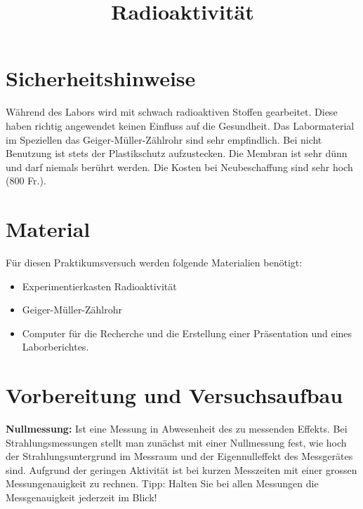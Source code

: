 \documentclass[12pt,a4paper, twosite]{article}
\author{}
\date{}
\title{Radioaktivität}
\begin{document}
\maketitle

\section*{Sicherheitshinweise}
Während des Labors wird mit schwach radioaktiven Stoffen gearbeitet. Diese haben richtig angewendet keinen Einfluss auf
die Gesundheit. Das Labormaterial im Speziellen das Geiger-Müller-Zählrohr sind sehr empfindlich.
Bei nicht Benutzung ist stets der Plastikschutz aufzustecken. Die Membran ist sehr dünn und darf niemals berührt werden.
Die Kosten bei Neubeschaffung sind sehr hoch (800 Fr.).

\section*{Material}
Für diesen Praktikumsversuch werden folgende Materialien benötigt:
\begin{itemize}
	\item Experimentierkasten Radioaktivität 
	\item Geiger-Müller-Zählrohr
	\item Computer für die Recherche und die Erstellung einer Präsentation und eines Laborberichtes.
\end{itemize}

\section*{Vorbereitung und Versuchsaufbau}

\textbf{Nullmessung:}
Ist eine Messung in Abwesenheit des zu messenden Effekts.
Bei Strahlungsmessungen stellt man zunächst mit einer Nullmessung fest, 
wie hoch der Strahlungsuntergrund im Messraum und der Eigennulleffekt des Messgerätes sind.
Aufgrund der geringen Aktivität ist bei kurzen Messzeiten mit einer grossen Messungenauigkeit zu rechnen.
Tipp: Halten Sie bei allen Messungen die Messgenauigkeit jederzeit im Blick!
\end{document}
